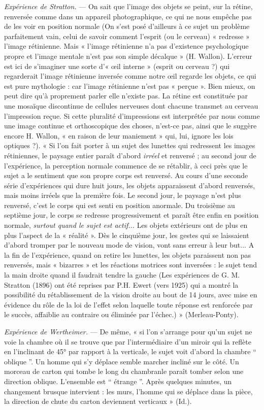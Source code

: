 \vspace{0.24cm}
{\footnotesize {\it Expérience de Stratton.} — On sait que l’image des objets
se peint, sur la
rétine, renversée comme dans un appareil photographique, ce qui ne nous
empêche pas de les voir en position normale {\scriptsize (On s’est posé
d'ailleurs à ce sujet un problème parfaitement vain, celui de savoir comment
l'esprit (ou le cerveau) « redresse » l’image rétinienne. Mais « l’image
rétinienne n’a pas d'existence psychologique propre et l'image mentale n’est
pas son simple décalque » (H. Wallon). L'erreur est ici de s’imaginer une sorte
d’« œil interne » (esprit ou cerveau ?) qui regarderait l’image rétinienne
inversée comme notre œil regarde les objets, ce qui est pure mythologie :
car l'image rétinienne n’est pas « perçue ». Bien mieux, on peut dire qu’à
proprement parler elle n’existe pas. La rétine est constituée par une
mosaïque discontinue de cellules nerveuses dont chacune transmet au cerveau
l’impression reçue. Si cette pluralité d’impressions est interprétée par nous
comme une image continue et orthoscopique des choses, n'est-ce pas, ainsi que
le suggère encore H. Wallon, « en raison de leur maniement » qui, lui, ignore
les lois optiques ?)}. « Si l’on fait porter à un sujet des lunettes qui
redressent les images rétiniennes, le paysage entier paraît
d’abord {\it irréel} et renversé ; au second jour de l’expérience, la perception
normale commence de se rétablir, à ceci près que le sujet a le sentiment que
son propre corps est renversé. Au cours d’une seconde série d’expériences
qui dure huit jours, les objets apparaissent d’abord renversés, mais moins
irréels que la première fois. Le second jour, le paysage n’est plus renversé,
c’est le corps qui est senti en position anormale. Du troisième au septième
jour, le corps se redresse progressivement et paraît être enfin en position
normale, {\it surtout quand le sujet est actif...} Les objets extérieurs ont de plus
en plus l’aspect de la « réalité ». Dès le cinquième jour, les gestes qui se
laissaient d’abord tromper par le nouveau mode de vision, vont sans erreur
à leur but... A la fin de l’expérience, quand on retire les lunettes, les objets
paraissent non pas renversés, mais « bizarres » et les réactions motrices
sont inversées : le sujet tend la main droite quand il faudrait tendre la
gauche {\scriptsize (Les expériences de G. M. Stratton (1896) ont été reprises
par P.H. Ewert (vers 1925) qui a montré la possibilité du rétablissement de la
vision droite au bout de 14 jours, avec mise en évidence du rôle de la loi de
l'effet selon laquelle toute réponse est renforcée par le succès, affaiblie
au contraire ou éliminée par l'échec.)} » (Merleau-Ponty).

{\it Expérience de Wertheimer.} — De même, « si l’on s'arrange pour qu’un sujet
ne voie la chambre où il se trouve que par l'intermédiaire d’un miroir
qui la reflète en l’inclinant de 45° par rapport à la verticale, le sujet voit
d’abord la chambre “ oblique ”. Un homme qui s’y déplace semble marcher
incliné sur le côté. Un morceau de carton qui tombe le long du chambranle
paraît tomber selon une direction oblique. L'ensemble est “ étrange ”.
Après quelques minutes, un changement brusque intervient : les murs,
l’homme qui se déplace dans la pièce, la direction de chute du carton
deviennent verticaux » (Id.).}
